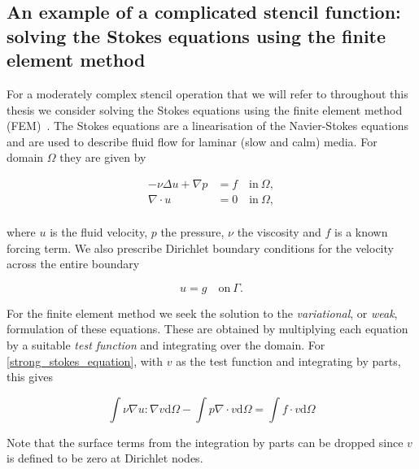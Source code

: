 
\subsection{An example of a complicated stencil function: solving the Stokes equations using the finite element method}

For a moderately complex stencil operation that we will refer to throughout this thesis we consider solving the Stokes equations using the finite element method (FEM)~\citep{larsonFiniteElementMethod2013}.
The Stokes equations are a linearisation of the Navier-Stokes equations and are used to describe fluid flow for laminar (slow and calm) media.
For domain $\Omega$ they are given by

\begin{align}
  \label{strong_stokes_equation}
  - \nu \Delta u + \nabla p &= f \quad \textrm{in} \ \Omega, \\
  \nabla \cdot u &= 0 \quad \textrm{in} \ \Omega, \\
\end{align}

where $u$ is the fluid velocity, $p$ the pressure, $\nu$ the viscosity and $f$ is a known forcing term.
We also prescribe Dirichlet boundary conditions for the velocity across the entire boundary

\begin{equation}
  \label{strong_stokes_equation_bc}
  u = g \quad \textrm{on} \ \Gamma. 
\end{equation}

For the finite element method we seek the solution to the \textit{variational}, or \textit{weak}, formulation of these equations.
These are obtained by multiplying each equation by a suitable \textit{test function} and integrating over the domain.
For \ref{strong_stokes_equation}, with $v$ as the test function and integrating by parts, this gives

\begin{equation}
  \int \nu \nabla u : \nabla v \textrm{d}\Omega
  - \int p \nabla \cdot v \textrm{d}\Omega
  = \int f \cdot v \textrm{d}\Omega
\end{equation}

Note that the surface terms from the integration by parts can be dropped since $v$ is defined to be zero at Dirichlet nodes.

